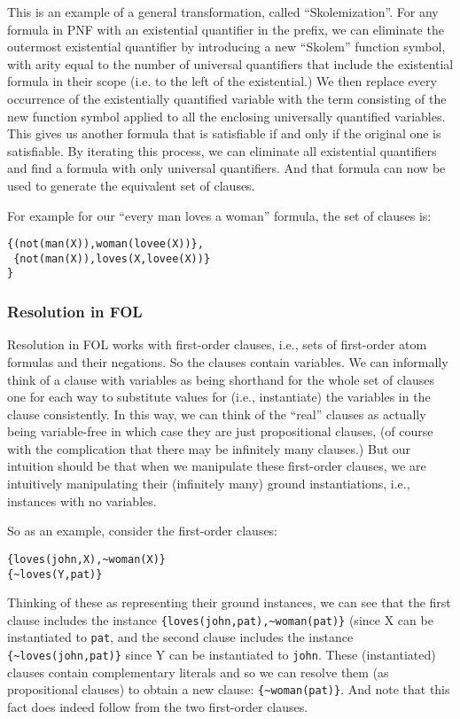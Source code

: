 This is an example of a general transformation, called
``Skolemization''.  For any formula in PNF with an existential
quantifier in the prefix, we can eliminate the outermost existential
quantifier by introducing a new ``Skolem'' function symbol, with arity
equal to the number of universal quantifiers that include the
existential formula in their scope (i.e. to the left of the
existential.)  We then replace every occurrence of the existentially
quantified variable  with the term consisting of the new function
symbol applied to all the enclosing universally quantified variables.
This gives us another formula that is satisfiable if and only if the
original one is satisfiable.  By iterating this process, we can
eliminate all existential quantifiers and find a formula with only
universal quantifiers.  And that formula can now be used to generate
the equivalent set of clauses.

For example for our ``every man loves a woman'' formula, the set of
clauses is:
\begin{verbatim}
{(not(man(X)),woman(lovee(X))},
 {not(man(X)),loves(X,lovee(X))}
}
\end{verbatim}

\subsubsection{Resolution in FOL}

Resolution in FOL works with first-order clauses, i.e., sets of
first-order atom formulas and their negations.  So the clauses contain
variables.  We can informally think of a clause with variables as
being shorthand for the whole set of clauses one for each way to
substitute values for (i.e., instantiate) the variables in the clause
consistently.  In this way, we can think of the ``real'' clauses as
actually being variable-free in which case they are just propositional
clauses, (of course with the complication that there may be infinitely
many clauses.)  But our intuition should be that when we manipulate
these first-order clauses, we are intuitively manipulating their
(infinitely many) ground instantiations, i.e., instances with no
variables.

So as an example, consider the first-order clauses:
\begin{verbatim}
{loves(john,X),~woman(X)}
{~loves(Y,pat)}
\end{verbatim}
Thinking of these as representing their ground instances, we can see
that the first clause includes the instance
\verb|{loves(john,pat),~woman(pat)}| (since X can be instantiated
to \verb|pat|, and the second clause includes the instance
\verb|{~loves(john,pat)}| since Y can be instantiated to \verb|john|.
These (instantiated) clauses contain complementary literals and so we
can resolve them (as propositional clauses) to obtain a new clause:
\verb|{~woman(pat)}|.  And note that this fact does indeed follow from the
two first-order clauses.

